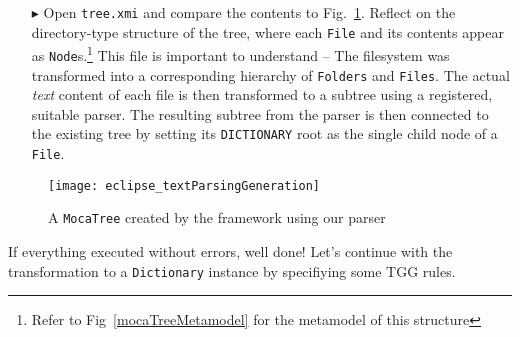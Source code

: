 \begin{itemize}

\item[$\blacktriangleright$] Open \texttt{tree.xmi} and compare the contents to Fig.~\ref{eclipse:treeResult}. Reflect on the directory-type structure of the
tree, where each \texttt{File} and its contents appear as \texttt{Node}s.\footnote{Refer to Fig~\ref{mocaTreeMetamodel} for the metamodel of this structure}
This file is important to understand -- The filesystem was transformed into a corresponding hierarchy of \texttt{Folders} and \texttt{Files}. The actual
\emph{text} content of each file is then transformed to a subtree using a registered, suitable parser. The resulting subtree from the parser is then connected
to the existing tree by setting its \texttt{DICTIONARY} root as the single child node of a \texttt{File}.

\end{itemize}

\vspace{0.5cm}

\begin{figure}[!htbp]
\begin{center}
 \texttt{[image: eclipse\_textParsingGeneration]}
  \caption{A \texttt{MocaTree} created by the framework using our parser}
  \label{eclipse:treeResult}
\end{center}
\end{figure}

If everything executed without errors, well done! Let's continue with the transformation to a \texttt{Dictionary} instance by specifiying some
TGG rules.
